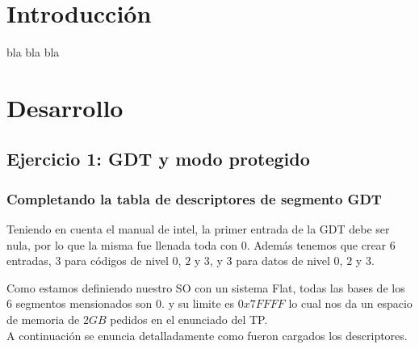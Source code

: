 \documentclass[a4paper,10pt,twoside]{article}
\begin{document}
\newpage




\tableofcontents

\newpage




\section{Introducción}

bla bla bla

\section{Desarrollo}
\subsection{Ejercicio 1: GDT y modo protegido}
\subsubsection{Completando la tabla de descriptores de segmento GDT}
Teniendo en cuenta el manual de intel, la primer entrada de la GDT debe ser nula, por lo que la misma fue llenada toda con $0$.
Además tenemos que crear $6$ entradas, $3$ para códigos de nivel $0$, $2$ y $3$, y $3$ para datos de nivel $0$, $2$ y $3$. 

Como estamos definiendo nuestro SO con un sistema Flat, todas las bases de los $6$ segmentos mensionados son $0$. y su limite es $0x7FFFF$ lo cual nos da un espacio de memoria de $2GB$ pedidos en el enunciado del TP. \\

A continuación se enuncia detalladamente como fueron cargados los descriptores. \\
\end{document}
